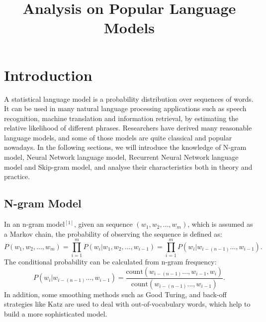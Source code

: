 \documentclass[11pt, oneside]{article}   	%
\title{Analysis on Popular Language Models}
\begin{document}
\maketitle
\section{Introduction}
A statistical language model is a probability distribution over sequences of words. It can be used in many natural language processing applications such as speech recognition, machine translation and information retrieval, by estimating the relative likelihood of different phrases. Researchers have derived many reasonable language models, and some of those models are quite classical and popular nowadays. In the following sections, we will introduce the knowledge of N-gram model, Neural Network language model, Recurrent Neural Network language model and Skip-gram model, and analyse their characteristics both in theory and practice.
\subsection{N-gram Model}
In an n-gram model$^{[1]}$, given an sequence $(w_1,w_2,...,w_m)$, which is assumed as a Markov chain, the probability of observing the sequence is defined as:
\[
P(w_1,w_2,...,w_m)=\prod_{i=1}^{m}{P(w_i|w_1,w_2,...,w_{i-1})}= \prod_{i=1}^{m}{P(w_i|w_{i-(n-1)}...,w_{i-1})}.
\]
The conditional probability can be calculated from n-gram frequency:
\[
P(w_i|w_{i-(n-1)}...,w_{i-1})=\frac{\text{count}(w_{i-(n-1)}...,w_{i-1},w_{i})}{\text{count}(w_{i-(n-1)}...,w_{i-1})}.
\]
In addition, some smoothing methods such as Good Turing, and back-off strategies like Katz are used to deal with out-of-vocabulary words, which help to build a more sophisticated model.
\end{document}
